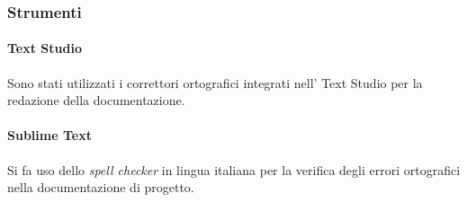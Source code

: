 



        \subsubsection{Strumenti}

            \paragraph{Text Studio}
            	Sono stati utilizzati i correttori ortografici integrati nell' Text Studio per la redazione della documentazione.

            \paragraph{Sublime Text}
                Si fa uso dello \textit{spell checker} in lingua italiana per la verifica degli errori ortografici nella documentazione di progetto.